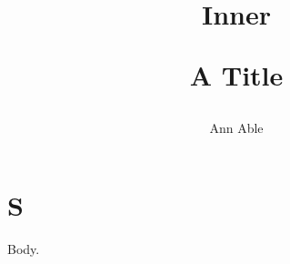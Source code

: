 \documentclass{article}
\begin{document}
\title{A Title \author{Ann Able \title{Inner}}}
\maketitle
\section{S}
Body.
\end{document}
